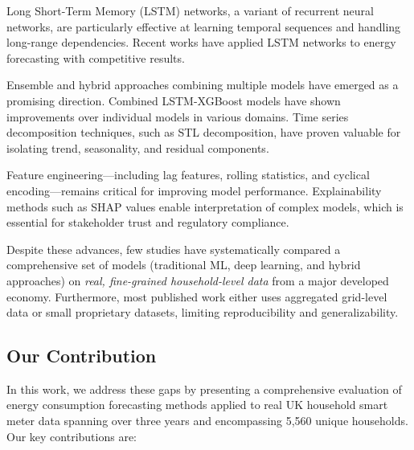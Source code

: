 Long Short-Term Memory (LSTM) networks, a variant of recurrent neural networks, are particularly effective at learning temporal sequences and handling long-range dependencies\cite{Hochreiter1997LongShortTerm}. Recent works have applied LSTM networks to energy forecasting with competitive results\cite{Shi2020LstmBased, Kelly2015MetaAnalysis}. 

Ensemble and hybrid approaches combining multiple models have emerged as a promising direction. Combined LSTM-XGBoost models have shown improvements over individual models in various domains\cite{Zheng2017VeryShortTerm}. Time series decomposition techniques, such as STL decomposition, have proven valuable for isolating trend, seasonality, and residual components\cite{Cleveland1990STL}. 

Feature engineering—including lag features, rolling statistics, and cyclical encoding—remains critical for improving model performance\cite{Taieb2012ShortTerm}. Explainability methods such as SHAP values enable interpretation of complex models, which is essential for stakeholder trust and regulatory compliance\cite{Lundberg2017UnifiedApproach}.

Despite these advances, few studies have systematically compared a comprehensive set of models (traditional ML, deep learning, and hybrid approaches) on \textit{real, fine-grained household-level data} from a major developed economy. Furthermore, most published work either uses aggregated grid-level data or small proprietary datasets, limiting reproducibility and generalizability.


\subsection{Our Contribution}

In this work, we address these gaps by presenting a comprehensive evaluation of energy consumption forecasting methods applied to real UK household smart meter data spanning over three years and encompassing 5,560 unique households. Our key contributions are:

